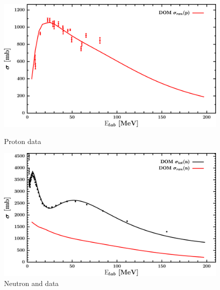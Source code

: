 \begin{figure}[H]
    \centering
    \begin{minipage}{0.45\textwidth}
        \centering
        \includegraphics[width=1.0\textwidth]{figures/ni58_protonInelastic.png}
        \caption{Proton \rxn data}
        \label{DOMFitData_ni58_proton_inelastic}
    \end{minipage}\hfill
    \begin{minipage}{0.45\textwidth}
        \centering
        \includegraphics[width=1.0\textwidth]{figures/ni58_neutronInelastic.png}
        \caption{Neutron \rxn and \tot data}
        \label{DOMFitData_ni58_neutron_inelastic}
    \end{minipage}
\end{figure}

\afterpage{\clearpage}


